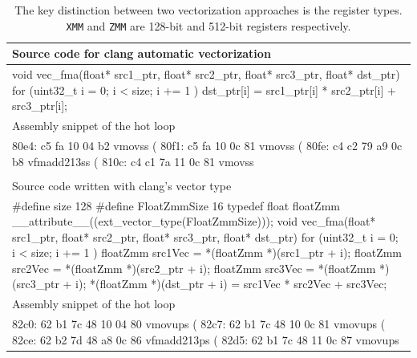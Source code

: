 \documentclass[logo,bsc,singlespacing,parskip]{infthesis}
\newenvironment{VerbatimCompact}
  {\vspace*{-2.5mm}\VerbatimEnvironment
   \par\Verbatim}
  {\endVerbatim\vspace*{-2.4mm}}
\begin{document}
\begin{table}[H]\captionsetup{name=Listing}
\captionsetup{justification=centering}
\begin{tabular}{>{\raggedright\arraybackslash}p{14cm}}
    Source code for clang automatic vectorization\\
    \midrule
    \begin{VerbatimCompact}
void vec_fma(float* src1_ptr, float* src2_ptr,
             float* src3_ptr, float* dst_ptr) {
    for (uint32_t i = 0; i < size; i += 1 ){
        dst_ptr[i] = src1_ptr[i] * src2_ptr[i] + src3_ptr[i];
    }
}
    \end{VerbatimCompact}
    \\
    Assembly snippet of the hot loop\\
    \midrule
    \begin{VerbatimCompact}
80e4: c5 fa 10 04 b2     vmovss (%
80f1: c5 fa 10 0c 81     vmovss (%
80fe: c4 c2 79 a9 0c b8  vfmadd213ss (%
810c: c4 c1 7a 11 0c 81  vmovss %
    \end{VerbatimCompact}
    \\
\\

    Source code written with clang's vector type\\
    \midrule
    \begin{VerbatimCompact}
#define size 128
#define FloatZmmSize 16
typedef float floatZmm __attribute__((ext_vector_type(FloatZmmSize)));
void vec_fma(float* src1_ptr, float* src2_ptr,
             float* src3_ptr, float* dst_ptr) {
    for (uint32_t i = 0; i < size; i += 1 ){
        floatZmm src1Vec = *(floatZmm *)(src1_ptr + i);
        floatZmm src2Vec = *(floatZmm *)(src2_ptr + i);
        floatZmm src3Vec = *(floatZmm *)(src3_ptr + i);
        *(floatZmm *)(dst_ptr + i) = src1Vec * src2Vec + src3Vec;
    }
}
    \end{VerbatimCompact}
    \\
    Assembly snippet of the hot loop\\
    \midrule
    \begin{VerbatimCompact}
82c0: 62 b1 7c 48 10 04 80   vmovups (%
82c7: 62 b1 7c 48 10 0c 81   vmovups (%
82ce: 62 b2 7d 48 a8 0c 86   vfmadd213ps (%
82d5: 62 b1 7c 48 11 0c 87   vmovups %
    \end{VerbatimCompact}
    \\
\end{tabular}
\caption{The key distinction between two vectorization approaches is the
register types. \texttt{XMM} and \texttt{ZMM} are 128-bit and 512-bit
registers respectively.}
\label{table:vec-fma-float}
\end{table}
\end{document}
